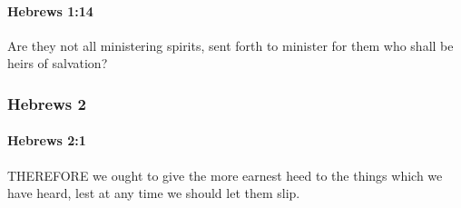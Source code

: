 		\paragraph{Hebrews 1:14} %
			\label{HEBREWS-1-14}

			Are they not all ministering spirits, sent forth to minister for them who shall be heirs of salvation?

			\begin{framed}
			\scriptsize
				\begin{compactdesc}
					\item[SBLG] 
				\end{compactdesc}
			\end{framed}

	\subsubsection{Hebrews 2} %
		\label{HEBREWS-2}
		
		\paragraph{Hebrews 2:1} %
			\label{HEBREWS-2-1}

			THEREFORE we ought to give the more earnest heed to the things which we have heard, lest at any time we should let them slip.


